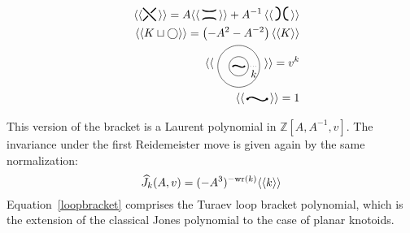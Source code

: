 \begin{eqnarray}
&&\langle\langle \raisebox{-.1cm}{\begin{tikzpicture}[scale=.2]
\draw [line width=0.35mm]  (-1,-1)-- (-0.22,-0.22);
\draw  [line width=0.35mm ](-1,1)--(0,0);
\draw  [line width=0.35mm] (0.22,0.22) -- (1,1);
\draw [line width=0.35mm]   (0,0) -- +(1,-1);
\end{tikzpicture}}\, \rangle \rangle=A \langle\langle \, \raisebox{-.07cm}{\begin{tikzpicture}[scale=.2]
\draw [line width=0.35mm] plot [smooth, tension=2] coordinates { (-1,.8) (0, 0.5) (1,.8)};
\draw [ line width=0.35mm] plot [smooth, tension=2] coordinates { (-1,-.8) (0, -0.5) (1,-.8)};
\end{tikzpicture}}\, \rangle\rangle   + A^{-1} \,\langle\langle\, \raisebox{-.1cm}{\begin{tikzpicture}[scale=.2]
 \draw [ line width=0.35mm] plot [smooth, tension=2] coordinates { (-1,-1) (-0.3, 0) (-1,1)};
 \draw [ line width=0.35mm] plot [smooth, tension=2] coordinates { (1,-1) (0.3, 0) (1,1)};
 \end{tikzpicture}}\, \rangle\rangle \label{regbracket1} \\
&&\langle\langle K \sqcup \bigcirc \rangle\rangle = \left (-A^2 - A^{-2}\right ) \langle\langle K \rangle\rangle \label{regbracket2}\\
&&\langle \langle \ \begin{tikzpicture}[scale=.06,baseline]
        \draw (4,0) circle (5);
        \draw (4,0) circle (10.8);
         \draw[line width=0.35mm] 
  (1,0) 
    .. controls (3,2) and (5,-2) .. 
  (7,0);  
\draw[black,fill=black] (1,0) circle (2ex);
\draw[black,fill=black] (7,0) circle (2ex);
\draw[dotted] (0:10) -- node[below] {{\small $k$}} (0:13.5);
           \end{tikzpicture}
           \
            \rangle\rangle = v^k \label{regbracket3}\\
&&  \langle\langle \, \raisebox{.07cm}{\begin{tikzpicture}[scale=.1, baseline]
\draw[line width=0.35mm] 
  (1,0) 
    .. controls (3,2) and (5,-2) .. 
  (7,0);  
\draw[black,fill=black] (1,0) circle (2ex);
\draw[black,fill=black] (7,0) circle (2ex);
\end{tikzpicture}}\, \rangle\rangle  = 1 \label{regbracket4}
\end{eqnarray}

This version of the bracket is a Laurent polynomial in $\mathbb{Z}[A,A^{-1},v]$. The invariance under the first Reidemeister move is given again by the same normalization:
\begin{equation}\label{loopbracket}
\widehat{J}_k(A, v) = (-A^3)^{- {\rm wr}(k)} \langle \langle k \rangle \rangle
\end{equation}
Equation~\ref{loopbracket} comprises the Turaev loop bracket polynomial, which is the extension of the classical Jones polynomial to the case of planar knotoids.

